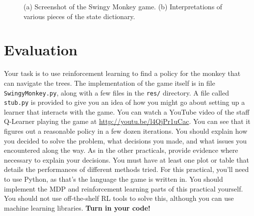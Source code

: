 \documentclass[12pt]{article}
\begin{document}
\begin{figure}[t]
    \centering%
    \hfill
    \caption{(a) Screenshot of the Swingy Monkey game.  (b) Interpretations of various pieces of the state dictionary.}
\end{figure}

\section*{Evaluation}

Your task is to use reinforcement learning to find a policy for the monkey that can navigate the trees.  The implementation of the game itself is in file \verb|SwingyMonkey.py|, along with a few files in the \verb|res/| directory.  A file called \verb|stub.py| is provided to give you an idea of how you might go about setting up a learner that interacts with the game.  You can watch a YouTube video of the staff Q-Learner playing the game at \url{http://youtu.be/l4QjPr1uCac}.  You can see that it figures out a reasonable policy in a few dozen iterations.  You should explain how you decided to solve the problem, what decisions you made, and what issues you encountered along the way.  As in the other practicals, provide evidence where necessary to explain your decisions. You must have at least one plot or table that details the performances of different methods tried. For this practical, you'll need to use Python, as that's the language the game is written in. You should implement the MDP and reinforcement learning parts of this practical yourself. You should not use off-the-shelf RL tools to solve this, although you can use machine learning libraries.  {\bf Turn in your code!}
\end{document}

